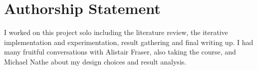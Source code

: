 \documentclass[10pt]{article}
\begin{document}
\section*{Authorship Statement}

I worked on this project solo including the literature review, the iterative implementation and experimentation, result gathering and final writing up. I had many fruitful conversations with Alistair Fraser, also taking the course, and Michael Nathe about my design choices and result analysis. 





\end{document}

